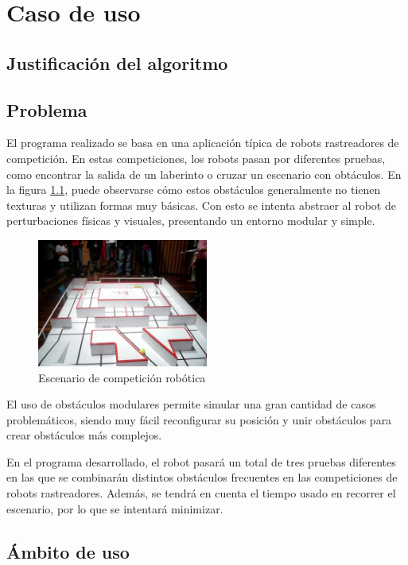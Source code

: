 \chapter{Caso de uso}
\label{caso_de_uso}

\section{Justificación del algoritmo}
\label{justificacion}


\section{Problema}
\label{problema}

El programa realizado se basa en una aplicación típica de robots rastreadores de competición. En estas competiciones, los robots pasan por diferentes pruebas, como encontrar la salida de un laberinto o cruzar un escenario con obtáculos. En la figura \ref{fig:competi1}, puede observarse cómo estos obstáculos generalmente no tienen texturas y utilizan formas muy básicas. Con esto se intenta abstraer al robot de perturbaciones físicas y visuales, presentando un entorno modular y simple.

\begin{figure}[h]
		\centering
        \includegraphics[width=0.5\textwidth]{images/competi1.jpg}
        \caption{Escenario de competición robótica}
        \label{fig:competi1}
\end{figure}  

El uso de obstáculos modulares permite simular una gran cantidad de casos problemáticos, siendo muy fácil reconfigurar su posición y unir obstáculos para crear obstáculos más complejos.

En el programa desarrollado, el robot pasará un total de tres pruebas diferentes en las que se combinarán distintos obstáculos frecuentes en las competiciones de robots rastreadores. Además, se tendrá en cuenta el tiempo usado en recorrer el escenario, por lo que se intentará minimizar.



\section{Ámbito de uso}
\label{ambito}


